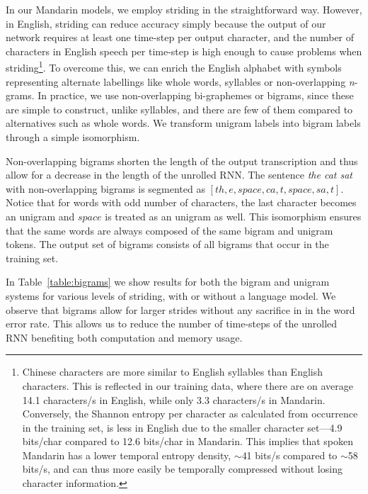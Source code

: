 In our Mandarin models, we employ striding in the straightforward way. However,
in English, striding can reduce accuracy simply because the output of our
network requires at least one time-step per output character, and the number of
characters in English speech per time-step is high enough to cause problems
when striding\footnote{Chinese characters are more similar to English syllables
than English characters. This is reflected in our training data, where there
are on average 14.1 characters/s in English, while only 3.3 characters/s in
Mandarin. Conversely, the Shannon entropy per character as calculated from
occurrence in the training set, is less in English due to the smaller character
set---4.9 bits/char compared to 12.6 bits/char in Mandarin. This implies that
spoken Mandarin has a lower temporal entropy density, $\sim$41 bits/s compared
to $\sim$58 bits/s, and can thus more easily be temporally compressed without
losing character information.}. To overcome this, we can enrich the English
alphabet with symbols representing alternate labellings like whole words,
syllables or non-overlapping \emph{n}-grams. In practice, we use
non-overlapping bi-graphemes or bigrams, since these are simple to construct,
unlike syllables, and there are few of them compared to alternatives such as
whole words. We transform unigram labels into bigram labels through a simple
isomorphism.

Non-overlapping bigrams shorten the length of the output transcription and thus
allow for a decrease in the length of the unrolled RNN. The sentence \emph{the
cat sat} with non-overlapping bigrams is segmented as $[th, e, space, ca, t,
space, sa, t ]$. Notice that for words with odd number of characters, the last
character becomes an unigram and $space$ is treated as an unigram as well. This
isomorphism ensures that the same words are always composed of the same bigram
and unigram tokens. The output set of bigrams consists of all bigrams that
occur in the training set. 

In Table~\ref{table:bigrams} we show results for both the bigram and unigram
systems for various levels of striding, with or without a language model. We
observe that bigrams allow for larger strides without any sacrifice in in the
word error rate. This allows us to reduce the number of time-steps of the
unrolled RNN benefiting both computation and memory usage.

